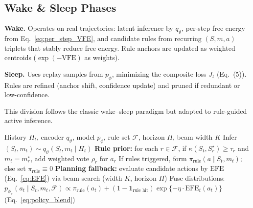 \documentclass{article} %
\begin{document}
\subsection{Wake \& Sleep Phases}
\textbf{Wake.} Operates on real trajectories: latent inference by $q_{\vartheta}$, per-step free energy from Eq.~\ref{eq:per_step_VFE}, and candidate rules from recurring $(S,m,a)$ triplets that stably reduce free energy. Rule anchors are updated as weighted centroids ($\exp(-\mathrm{VFE})$ as weights).  

\textbf{Sleep.} Uses replay samples from $p_{\phi}$, minimizing the composite loss $J_t$ (Eq.~(5)). Rules are refined (anchor shift, confidence update) and pruned if redundant or low-confidence.  

This division follows the classic wake–sleep paradigm \citep{hinton1995wake,friston2015active} but adapted to rule-guided active inference.

\begin{algorithm}[ht]
\caption{Online Reasoning with Rule Fusion and Planning}
\label{alg:online-reasoning}
\begin{algorithmic}[1]
\Require History $H_t$, encoder $q_{\vartheta}$, model $p_{\phi}$, rule set $\mathcal F$, horizon $H$, beam width $K$
\State Infer $(S_t,m_t)\!\sim\!q_{\vartheta}(S_t,m_t\mid H_t)$
\State \textbf{Rule prior:} for each $r\in\mathcal F$, if $\kappa(S_t,S_r^\star)\!\ge\!\tau_r$ and $m_t=m_r^\star$, add weighted vote $\rho_r$ for $a_r$
\State If rules triggered, form $\pi_{\text{rule}}(a\mid S_t,m_t)$; else set $\pi_{\text{rule}}\equiv 0$
\State \textbf{Planning fallback:} evaluate candidate actions by $\mathrm{EFE}$ (Eq.~\ref{eq:EFE}) via beam search (width $K$, horizon $H$)
\State Fuse distributions: $p_{\phi_\pi}(a_t\mid S_t,m_t,\mathcal F) \propto \pi_{\text{rule}}(a_t) + (1-\mathbf{1}_{\text{rule hit}})\exp\{-\eta\cdot\mathrm{EFE}_t(a_t)\}$ \hfill (Eq.~\ref{eq:policy_blend})
\end{algorithmic}
\end{algorithm}
\end{document}
